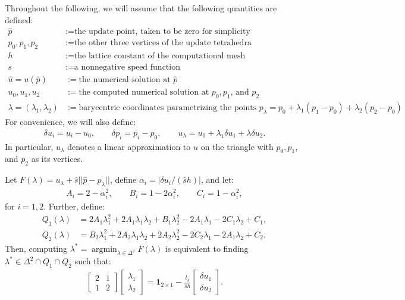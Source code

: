 \documentclass{article}
\begin{document}
Throughout the following, we will assume that the following quantities
are defined:
\begin{align*}
  \hat{p} &:= \text{the update point, taken to be zero for simplicity} \\
  p_0, p_1, p_2 &:= \text{the other three vertices of the update tetrahedra} \\
  h &:= \text{the lattice constant of the computational mesh} \\
  s &:= \text{a nonnegative speed function} \\
  \hat{u} = u(\hat{p}) &:= \text{the numerical solution at $\hat{p}$} \\
  u_0, u_1, u_2 &:= \text{the computed numerical solution at $p_0, p_1$, and $p_2$} \\
  \lambda = (\lambda_1, \lambda_2) &:= \text{barycentric coordinates parametrizing the points $p_\lambda = p_0 + \lambda_1 (p_1 - p_0) + \lambda_2 (p_2 - p_0)$}
\end{align*}
For convenience, we will also define:
\begin{align*}
  \delta u_i = u_i - u_0, \qquad \delta p_i = p_i - p_0, \qquad u_\lambda = u_0 + \lambda_1 \delta u_1 + \lambda \delta u_2.
\end{align*}
In particular, $u_\lambda$ denotes a linear approximation to $u$ on
the triangle with $p_0, p_1$, and $p_2$ as its vertices.

\begin{lemma}
  Let $F(\lambda) = u_\lambda + \hat{s} ||\hat{p} - p_\lambda||$,
  define $\alpha_i = |\delta u_i/(\hat{s} h)|$, and let:
  \begin{align*}
    A_i = 2 - \alpha_i^2, \qquad B_i = 1 - 2\alpha_i^2, \qquad C_i = 1 - \alpha_i^2,
  \end{align*}
  for $i = 1, 2$. Further, define:
  \begin{align*}
    Q_1(\lambda) &= 2A_1\lambda_1^2 + 2A_1\lambda_1\lambda_2 + B_1\lambda_2^2 -2A_1\lambda_1 -2C_1\lambda_2 + C_1, \\
    Q_2(\lambda) &= B_2\lambda_1^2 + 2A_2\lambda_1\lambda_2 + 2A_2\lambda_2^2 -2C_2\lambda_1 -2A_1\lambda_2 + C_2.
  \end{align*}
  Then, computing
  $\lambda^* = \operatorname{argmin}_{\lambda \in \Delta^2}
  F(\lambda)$ is equivalent to finding
  $\lambda^* \in \Delta^2 \cap Q_1 \cap Q_2$ such that:
  \begin{align*}
    \begin{bmatrix}
      2 & 1 \\ 1 & 2
    \end{bmatrix} \begin{bmatrix}
      \lambda_1 \\ \lambda_2
    \end{bmatrix} = \boldsymbol{1}_{2 \times 1} - \frac{l_\lambda}{\hat{s} h} \begin{bmatrix}
      \delta u_1 \\ \delta u_2
    \end{bmatrix}.
  \end{align*}
\end{lemma}
\end{document}
